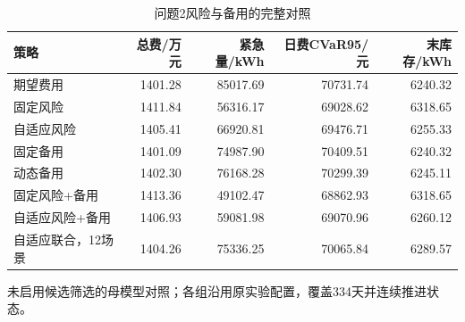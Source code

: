 \begin{table}[htbp]\centering\small
\caption{问题2风险与备用的完整对照}
\label{tab:v2_risk_modules}
\begin{tabularx}{\linewidth}{LRRRR}\toprule
策略 & 总费/万元 & 紧急量/kWh & 日费CVaR95/元 & 末库存/kWh\\\midrule
期望费用 & 1401.28 & 85017.69 & 70731.74 & 6240.32\\
固定风险 & 1411.84 & 56316.17 & 69028.62 & 6318.65\\
自适应风险 & 1405.41 & 66920.81 & 69476.71 & 6255.33\\
固定备用 & 1401.09 & 74987.90 & 70409.51 & 6240.32\\
动态备用 & 1402.30 & 76168.28 & 70299.39 & 6245.11\\
固定风险+备用 & 1413.36 & 49102.47 & 68862.93 & 6318.65\\
自适应风险+备用 & 1406.93 & 59081.98 & 69070.96 & 6260.12\\
自适应联合，12场景 & 1404.26 & 75336.25 & 70065.84 & 6289.57\\
\bottomrule\end{tabularx}
\par\smallskip\parbox{\linewidth}{\footnotesize 未启用候选筛选的母模型对照；各组沿用原实验配置，覆盖334天并连续推进状态。}
\end{table}
